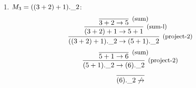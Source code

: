 \begin{enumerate}
	                            \item $M_3 = ((3+2)+1).\_2$:
	                              \[
		                      \infer[\text{\small{(project-2)}}]
		                            {\SND{(\SUM{(\SUM{3}{2})}{1})} \to \SND{(\SUM{5}{1})}}
		                            {
			                      \infer[\text{\small{(sum-l)}}]
			                            {\SUM{(\SUM{3}{2})}{1} \to \SUM{5}{1}}
			                            {
				                      \infer[\text{\small{(sum)}}]{\SUM{3}{2} \to 5}{}
			                            }
		                            }
	                                    \]
	                                    \[
		                            \infer[\text{\small{(project-2)}}]
		                                  {\SND{(\SUM{5}{1})} \to \SND{(6)}}
		                                  { \infer[\text{\small{(sum)}}]{\SUM{5}{1} \to 6}{} }
	                                          \]
	                                          \[
		                                  \infer{\SND{(6)} \not\to }{}
	                                          \]
\end{enumerate}

